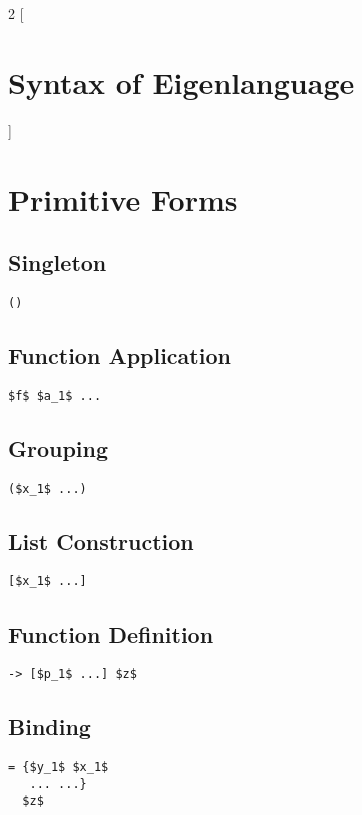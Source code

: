 \documentclass{article}
\begin{document}
\begin{multicols} 2
[\section*{\huge Syntax of Eigenlanguage}]

\section*{Primitive Forms}

\subsection*{Singleton}
\begin{lstlisting}[mathescape]
()
\end{lstlisting}

\subsection*{Function Application}
\begin{lstlisting}[mathescape]
$f$ $a_1$ ...
\end{lstlisting}

\subsection*{Grouping}
\begin{lstlisting}[mathescape]
($x_1$ ...)
\end{lstlisting}

\subsection*{List Construction}
\begin{lstlisting}[mathescape]
[$x_1$ ...]
\end{lstlisting}

\subsection*{Function Definition}
\begin{lstlisting}[mathescape]
-> [$p_1$ ...] $z$
\end{lstlisting}

\subsection*{Binding}
\begin{lstlisting}[mathescape]
= {$y_1$ $x_1$
   ... ...}
  $z$
\end{lstlisting}


\end{multicols}
\end{document}
